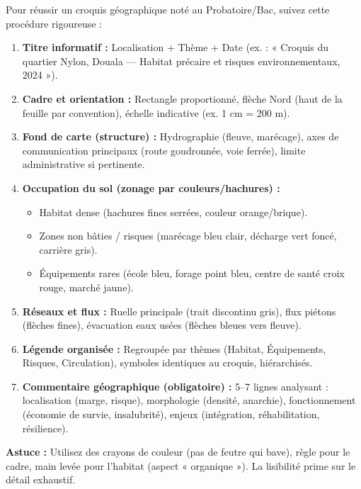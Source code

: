 \documentclass[11pt]{article}
\begin{document}
\begin{methode}
Pour réussir un croquis géographique noté au Probatoire/Bac, suivez cette procédure rigoureuse :
\begin{enumerate}
    \item \textbf{Titre informatif :} Localisation + Thème + Date (ex. : « Croquis du quartier Nylon, Douala — Habitat précaire et risques environnementaux, 2024 »).
    \item \textbf{Cadre et orientation :} Rectangle proportionné, flèche Nord (haut de la feuille par convention), échelle indicative (ex. 1 cm = 200 m).
    \item \textbf{Fond de carte (structure) :} Hydrographie (fleuve, marécage), axes de communication principaux (route goudronnée, voie ferrée), limite administrative si pertinente.
    \item \textbf{Occupation du sol (zonage par couleurs/hachures) :}
    \begin{itemize}
        \item Habitat dense (hachures fines serrées, couleur \textcolor{poporange!70!popdark}{orange/brique}).
        \item Zones non bâties / risques (marécage \textcolor{popblue!30}{bleu clair}, décharge \textcolor{popgreen!40!black}{vert foncé}, carrière \textcolor{popmuted}{gris}).
        \item Équipements rares (école \textcolor{popblue}{bleu}, forage \textcolor{popblue}{point bleu}, centre de santé \textcolor{popred}{croix rouge}, marché \textcolor{popgold}{jaune}).
    \end{itemize}
    \item \textbf{Réseaux et flux :} Ruelle principale (trait discontinu \textcolor{popmuted}{gris}), flux piétons (flèches fines), évacuation eaux usées (flèches \textcolor{popblue}{bleues} vers fleuve).
    \item \textbf{Légende organisée :} Regroupée par thèmes (Habitat, Équipements, Risques, Circulation), symboles identiques au croquis, hiérarchisés.
    \item \textbf{Commentaire géographique (obligatoire) :} 5--7 lignes analysant : localisation (marge, risque), morphologie (densité, anarchie), fonctionnement (économie de survie, insalubrité), enjeux (intégration, réhabilitation, résilience).
\end{enumerate}
\textbf{Astuce :} Utilisez des crayons de couleur (pas de feutre qui bave), règle pour le cadre, main levée pour l'habitat (aspect « organique »). La lisibilité prime sur le détail exhaustif.
\end{methode}
\end{document}
